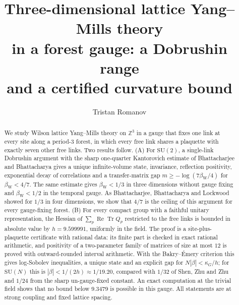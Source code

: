 \documentclass[11pt]{amsart}
\theoremstyle{definition}
\theoremstyle{remark}
\newcommand{\Tr}{\operatorname{Tr}}
\renewcommand{\Re}{\operatorname{Re}}
\newcommand{\SU}{\mathrm{SU}}
\newcommand{\Z}{\mathbb{Z}}
\begin{document}
\title[Lattice Yang--Mills theory in a forest gauge]{Three-dimensional lattice Yang--Mills theory\\ in a forest gauge: a Dobrushin range\\ and a certified curvature bound}
\author{Tristan Romanov}
\date{}

\begin{abstract}
We study Wilson lattice Yang--Mills theory on $\Z^3$ in a gauge that fixes one link at every site along a
period-$3$ forest, in which every free link shares a plaquette with exactly seven other free links. Two results
follow. (A) For $\SU(2)$, a single-link Dobrushin argument with the sharp one-quarter Kantorovich estimate of
Bhattacharjee and Bhattacharya gives a unique infinite-volume state, invariance, reflection positivity, exponential
decay of correlations and a transfer-matrix gap $m\ge-\log(7\beta_{\mathrm W}/4)$ for $\beta_{\mathrm W}<4/7$. The
same estimate gives $\beta_{\mathrm W}<1/3$ in three dimensions without gauge fixing and $\beta_{\mathrm W}<1/2$ in
the temporal gauge. As Bhattacharjee, Bhattacharya and Lockwood showed for $1/3$ in four dimensions, we show that
$4/7$ is the ceiling of this argument for every gauge-fixing forest. (B) For every compact group with a faithful unitary representation, the Hessian of
$\sum_p\Re\Tr Q_p$ restricted to the free links is bounded in absolute value by $h=9.599991$, uniformly in the
field. The proof is a site-plus-plaquette certificate with rational data: its finite part is checked in exact
rational arithmetic, and positivity of a two-parameter family of matrices of size at most $12$ is proved with
outward-rounded interval arithmetic. With the Bakry--\'Emery criterion this gives log-Sobolev inequalities, a unique state and an explicit
gap for $N|\beta|<\kappa_G/h$; for $\SU(N)$ this is $|\beta|<1/(2h)\approx1/19.20$, compared with $1/32$ of Shen,
Zhu and Zhu and $1/24$ from the sharp un-gauge-fixed constant. An exact computation at the trivial field shows that
no bound below $9.3479$ is possible in this gauge. All statements are at strong coupling and fixed lattice spacing.
\end{abstract}

\maketitle
\end{document}
